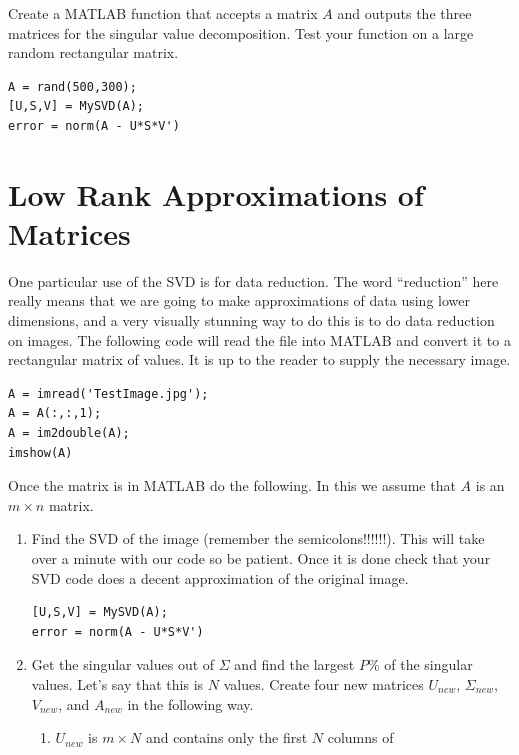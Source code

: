 \begin{problem}
    Create a MATLAB function that accepts a matrix $A$ and outputs the three matrices for
    the singular value decomposition.  Test your function on a large random rectangular
    matrix.
\begin{lstlisting}
A = rand(500,300);
[U,S,V] = MySVD(A);
error = norm(A - U*S*V')
\end{lstlisting}
\end{problem}






\section{Low Rank Approximations of Matrices}

\begin{problem}
    One particular use of the SVD is for data reduction.  The word ``reduction'' here
    really means that we are going to make approximations of data using lower dimensions,
    and a very visually stunning way to do this is to do data reduction on images.  The following code will read
    the file  into MATLAB and convert it to a rectangular matrix of
    values.  It is up to the reader to supply the necessary image.
\begin{lstlisting}
A = imread('TestImage.jpg');
A = A(:,:,1);
A = im2double(A);
imshow(A)
\end{lstlisting}
    Once the matrix is in MATLAB do the following.  In this we assume that $A$ is an $m
    \times n$ matrix.
    \begin{enumerate}
        \item Find the SVD of the image (remember the semicolons!!!!!!).  This will take
            over a minute with our code so be patient.  Once it is done check that your
            SVD code does a decent approximation of the original image.
\begin{lstlisting}
[U,S,V] = MySVD(A);
error = norm(A - U*S*V')
\end{lstlisting}
        \item Get the singular values out of $\Sigma$ and find the largest $P$\% of the
            singular values. Let's say that this is $N$ values.  Create four new matrices
            $U_{new}$, $\Sigma_{new}$, $V_{new}$, and $A_{new}$ in the following way.
            \begin{enumerate}
                \item $U_{new}$ is $m \times N$ and contains only the first $N$ columns of

\end{enumerate}
\end{enumerate}
\end{problem}

